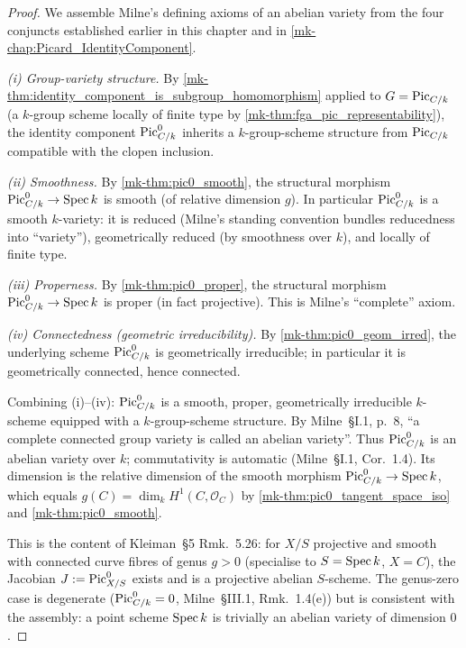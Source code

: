 \begin{proof}
  We assemble Milne's defining axioms of an abelian variety from the
  four conjuncts established earlier in this chapter and in
  \ref{mk-chap:Picard_IdentityComponent}.

  \emph{(i) Group-variety structure.} By
  \ref{mk-thm:identity_component_is_subgroup_homomorphism} applied to
  \(G = \operatorname{Pic}_{C/k}\) (a \(k\)-group scheme locally of finite type by
  \ref{mk-thm:fga_pic_representability}), the identity component
  \(\operatorname{Pic}^0_{C/k}\) inherits a \(k\)-group-scheme structure from
  \(\operatorname{Pic}_{C/k}\) compatible with the clopen inclusion.

  \emph{(ii) Smoothness.} By \ref{mk-thm:pic0_smooth}, the structural
  morphism \(\operatorname{Pic}^0_{C/k} \to \operatorname{Spec} k\) is smooth (of relative
  dimension \(g\)). In particular \(\operatorname{Pic}^0_{C/k}\) is a smooth
  \(k\)-variety: it is reduced (Milne's standing convention bundles
  reducedness into ``variety''), geometrically reduced (by
  smoothness over \(k\)), and locally of finite type.

  \emph{(iii) Properness.} By \ref{mk-thm:pic0_proper}, the structural
  morphism \(\operatorname{Pic}^0_{C/k} \to \operatorname{Spec} k\) is proper (in fact
  projective). This is Milne's ``complete'' axiom.

  \emph{(iv) Connectedness (geometric irreducibility).} By
  \ref{mk-thm:pic0_geom_irred}, the underlying scheme
  \(\operatorname{Pic}^0_{C/k}\) is geometrically irreducible; in particular it is
  geometrically connected, hence connected.

  Combining (i)--(iv): \(\operatorname{Pic}^0_{C/k}\) is a smooth, proper,
  geometrically irreducible \(k\)-scheme equipped with a
  \(k\)-group-scheme structure. By Milne~\S I.1, p.~8, ``a complete
  connected group variety is called an abelian variety''. Thus
  \(\operatorname{Pic}^0_{C/k}\) is an abelian variety over \(k\); commutativity is
  automatic (Milne~\S I.1, Cor.~1.4). Its dimension is the relative
  dimension of the smooth morphism \(\operatorname{Pic}^0_{C/k} \to \operatorname{Spec} k\),
  which equals \(g(C) = \dim_k H^1(C, \mathcal{O}_C)\) by
  \ref{mk-thm:pic0_tangent_space_iso} and \ref{mk-thm:pic0_smooth}.

  This is the content of Kleiman~\S 5 Rmk.~5.26: for \(X/S\)
  projective and smooth with connected curve fibres of genus
  \(g > 0\) (specialise to \(S = \operatorname{Spec} k\), \(X = C\)), the Jacobian
  \(J := \operatorname{Pic}^0_{X/S}\) exists and is a projective abelian
  \(S\)-scheme. The genus-zero case is degenerate
  (\(\operatorname{Pic}^0_{C/k} = 0\), Milne~\S III.1, Rmk.~1.4(e)) but is
  consistent with the assembly: a point scheme \(\operatorname{Spec} k\) is
  trivially an abelian variety of dimension \(0\).
\end{proof}
